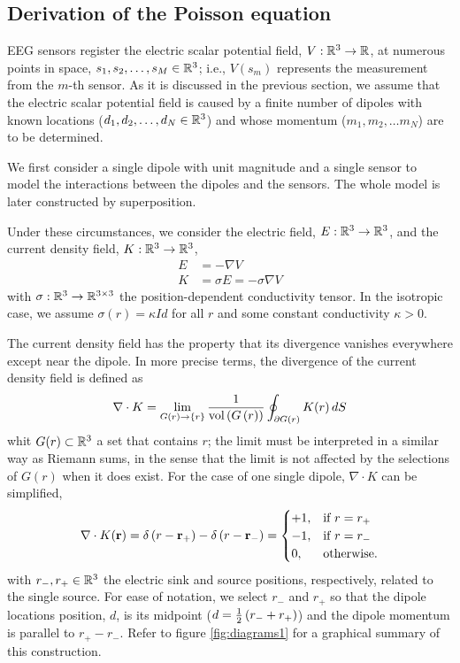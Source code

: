 
\subsection{Derivation of the Poisson equation}

EEG sensors register the electric scalar potential field, $V: \mathbb{R}^3 \rightarrow \mathbb{R}$, at numerous points in space, $s_{1}, s_2, \dots, s_M \in \mathbb{R}^3$; i.e., $V(s_m)$ represents the measurement from the $m$-th sensor.
%
As it is discussed in the previous section, we assume that the electric scalar potential field is caused by a finite number of dipoles with known locations ($d_1, d_2, \dots, d_N \in \mathbb{R}^3$) and whose momentum ($m_1, m_2, \dots m_N$) are to be determined.

We first consider a single dipole with unit magnitude and a single sensor to model the interactions between the dipoles and the sensors. The whole model is later constructed by superposition.

Under these circumstances, we consider the electric field, $E: \mathbb{R}^3 \rightarrow \mathbb{R}^3$, and the current density field, $K: \mathbb{R}^3 \rightarrow \mathbb{R}^3$,
\begin{align}
E &= - \nabla V
\\
K &= \sigma E = - \sigma \nabla V
\label{eq:model1}
\end{align}
with $\sigma: \mathbb{R}^3 \rightarrow \mathbb{R}^{3\times 3}$ the position-dependent conductivity tensor. 
%
In the isotropic case, we assume
$\sigma(r) = \kappa Id$
for all $r$ and some constant conductivity $\kappa>0$.

The current density field has the property that its divergence vanishes everywhere except near the dipole.
%
In more precise terms, the divergence of the current density field is defined as
\begin{equation}
\nabla \cdot K = \lim_{G(r) \rightarrow \left\{ r \right\}} \frac{1}{\text{vol}\left( G\left( r \right) \right)}
\oint_{\partial G(r)} K(r)\, dS
\end{equation}
whit $G(r)\subset \mathbb{R}^3$ a set that contains $r$; the limit must be interpreted in a similar way as Riemann sums, in the sense that the limit is not affected by the selections of $G(r)$ when it does exist.
%
For the case of one single dipole, $\nabla \cdot K$ can be simplified,
\begin{equation}
\nabla \cdot K(\mathbf{r}) = {\delta\left( r-\mathbf{r}_+ \right) - \delta\left( r-\mathbf{r}_- \right)} =
\begin{cases}
+1, &\text{if } r=r_+ \\
-1, &\text{if } r=r_- \\
0, &\text{otherwise}.
\end{cases}
\label{eq:model2}
\end{equation}
with $r_-, r_+ \in \mathbb{R}^3$ the electric sink and source positions, respectively, related to the single source. 
%
For ease of notation, we select $r_-$ and $r_+$ so that the dipole locations position, $d$, is its midpoint ($d= \frac{1}{2}\left( r_-+r_+ \right)$) and the dipole momentum is parallel to $r_+-r_-$.
%
Refer to figure \ref{fig:diagrams1} for a graphical summary of this construction.

